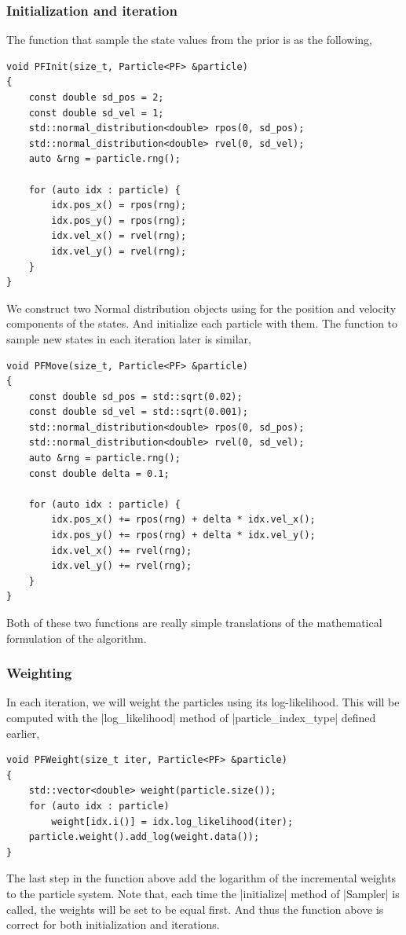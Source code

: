 \subsubsection{Initialization and iteration}

The function that sample the state values from the prior is as the following,
\begin{Verbatim}
void PFInit(size_t, Particle<PF> &particle)
{
    const double sd_pos = 2;
    const double sd_vel = 1;
    std::normal_distribution<double> rpos(0, sd_pos);
    std::normal_distribution<double> rvel(0, sd_vel);
    auto &rng = particle.rng();

    for (auto idx : particle) {
        idx.pos_x() = rpos(rng);
        idx.pos_y() = rpos(rng);
        idx.vel_x() = rvel(rng);
        idx.vel_y() = rvel(rng);
    }
}
\end{Verbatim}
We construct two Normal distribution objects using for the position and
velocity components of the states. And initialize each particle with them. The
function to sample new states in each iteration later is similar,
\begin{Verbatim}
void PFMove(size_t, Particle<PF> &particle)
{
    const double sd_pos = std::sqrt(0.02);
    const double sd_vel = std::sqrt(0.001);
    std::normal_distribution<double> rpos(0, sd_pos);
    std::normal_distribution<double> rvel(0, sd_vel);
    auto &rng = particle.rng();
    const double delta = 0.1;

    for (auto idx : particle) {
        idx.pos_x() += rpos(rng) + delta * idx.vel_x();
        idx.pos_y() += rpos(rng) + delta * idx.vel_y();
        idx.vel_x() += rvel(rng);
        idx.vel_y() += rvel(rng);
    }
}
\end{Verbatim}
Both of these two functions are really simple translations of the mathematical
formulation of the algorithm.

\subsubsection{Weighting}

In each iteration, we will weight the particles using its log-likelihood. This
will be computed with the |log_likelihood| method of |particle_index_type|
defined earlier,
\begin{Verbatim}
void PFWeight(size_t iter, Particle<PF> &particle)
{
    std::vector<double> weight(particle.size());
    for (auto idx : particle)
        weight[idx.i()] = idx.log_likelihood(iter);
    particle.weight().add_log(weight.data());
}
\end{Verbatim}
The last step in the function above add the logarithm of the incremental
weights to the particle system. Note that, each time the |initialize| method of
|Sampler| is called, the weights will be set to be equal first. And thus the
function above is correct for both initialization and iterations.


